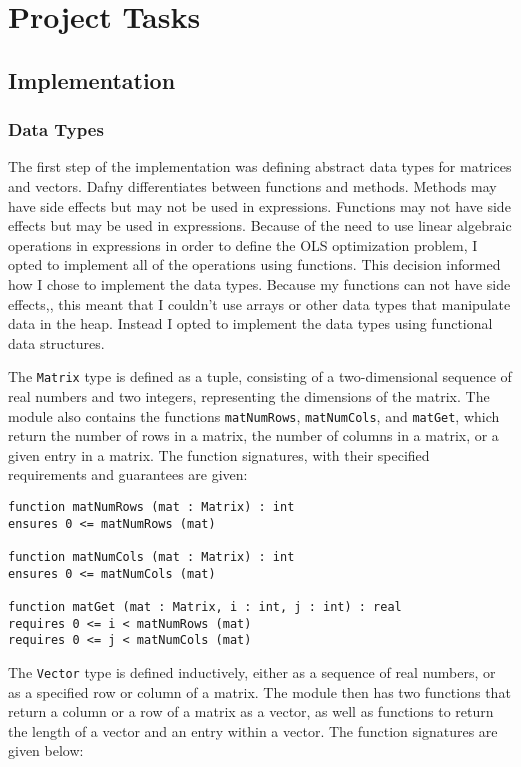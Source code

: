 \documentclass[12pt]{article}
\begin{document}
\section{Project Tasks}
\subsection{Implementation}
\subsubsection{Data Types}
The first step of the implementation was defining abstract data types for matrices and vectors. Dafny differentiates between functions and methods. Methods may have side effects but may not be used in expressions. Functions may not have side effects but may be used in expressions. Because of the need to use linear algebraic operations in expressions in order to define the OLS optimization problem, I opted to implement all of the operations using functions. This decision informed how I chose to implement the data types. Because my functions can not have side effects,, this meant that I couldn't use arrays or other data types that manipulate data in the heap. Instead I opted to implement the data types using functional data structures.

The \verb|Matrix| type is defined as a tuple, consisting of a two-dimensional sequence of real numbers and two integers, representing the dimensions of the matrix. The module also contains the functions \verb|matNumRows|, \verb|matNumCols|, and \verb|matGet|, which return the number of rows in a matrix, the number of columns in a matrix, or a given entry in a matrix. The function signatures, with their specified  requirements and guarantees are given:

\begin{verbatim}
function matNumRows (mat : Matrix) : int
ensures 0 <= matNumRows (mat)

function matNumCols (mat : Matrix) : int
ensures 0 <= matNumCols (mat)

function matGet (mat : Matrix, i : int, j : int) : real
requires 0 <= i < matNumRows (mat)
requires 0 <= j < matNumCols (mat)
\end{verbatim}

The \verb|Vector| type is defined inductively, either as a sequence of real numbers, or as a specified row or column of a matrix. The module then has two functions that return a column or a row of a matrix as a vector, as well as functions to return the length of a vector and an entry within a vector. The function signatures are given below:
\end{document}
